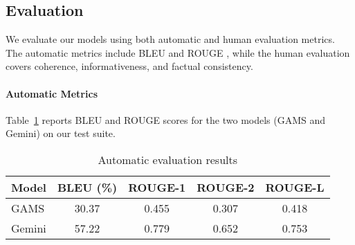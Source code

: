 \documentclass[fleqn,moreauthors,10pt]{ds_report}
\begin{document}
\subsection{Evaluation}

We evaluate our models using both automatic and human evaluation metrics.  
The automatic metrics include BLEU and ROUGE , while the human evaluation covers coherence, informativeness, and factual consistency.

\paragraph{Automatic Metrics}
Table~\ref{tab:auto-metrics} reports BLEU and ROUGE scores for the two models (GAMS and Gemini) on our test suite.

\begin{table}[h]
  \centering
  \caption{Automatic evaluation results}
  \label{tab:auto-metrics}
  \begin{tabular}{lcccc}
    \toprule
    Model   & BLEU (\%) & ROUGE-1 & ROUGE-2 & ROUGE-L \\
    \midrule
    GAMS    & 30.37     & 0.455   & 0.307   & 0.418   \\
    Gemini  & 57.22     & 0.779   & 0.652   & 0.753   \\
    \bottomrule
  \end{tabular}
\end{table}
\end{document}
